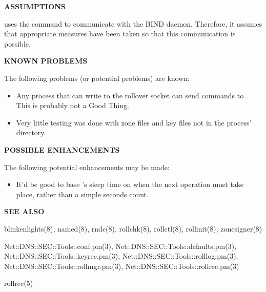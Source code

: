 {\bf ASSUMPTIONS}

 uses the  command to communicate with the BIND
 daemon.  Therefore, it assumes that appropriate measures have
been taken so that this communication is possible.

{\bf KNOWN PROBLEMS}

The following problems (or potential problems) are known:

\begin{itemize}

\item Any process that can write to the rollover socket can send commands to
.  This is probably not a Good Thing.

\item Very little testing was done with zone files and key files not in the
process' directory.

\end{itemize}

{\bf POSSIBLE ENHANCEMENTS}

The following potential enhancements may be made:

\begin{itemize}

\item It'd be good to base 's sleep time on when the next
operation must take place, rather than a simple seconds count.

\end{itemize}

{\bf SEE ALSO}

blinkenlights(8),
named(8),
rndc(8),
rollchk(8),
rollctl(8),
rollinit(8),
zonesigner(8)

Net::DNS::SEC::Tools::conf.pm(3),
Net::DNS::SEC::Tools::defaults.pm(3),\\
Net::DNS::SEC::Tools::keyrec.pm(3),
Net::DNS::SEC::Tools::rolllog.pm(3),\\
Net::DNS::SEC::Tools::rollmgr.pm(3),
Net::DNS::SEC::Tools::rollrec.pm(3)

rollrec(5)

